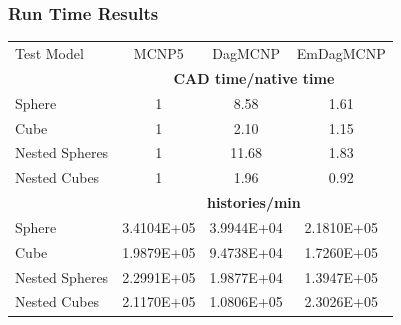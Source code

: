 \documentclass[12pt]{beamer}
\begin{document}
\begin{frame}
\frametitle{Run Time Results}

\begin{table}
  \small
  \begin{center}

      \label{timings}
    \begin{tabular}{lccc}


      \toprule
      Test Model & MCNP5 & DagMCNP & EmDagMCNP \\
      & \multicolumn{3}{c}{\textbf{CAD time/native time}} \\
      \hline
      Sphere & 1 & 8.58 & 1.61 \\
      Cube & 1 & 2.10 & 1.15 \\
      Nested Spheres & 1 & 11.68 & 1.83 \\
      Nested Cubes & 1 & 1.96 & 0.92 \\
      \hline
      &  \multicolumn{3}{c}{\textbf{histories/min}} \\
      \hline
      Sphere & 3.4104E+05  & 3.9944E+04  & 2.1810E+05   \\
      Cube & 1.9879E+05 & 9.4738E+04 & 1.7260E+05 \\
      Nested Spheres & 2.2991E+05 & 1.9877E+04 & 1.3947E+05 \\
      Nested Cubes & 2.1170E+05 & 1.0806E+05 & 2.3026E+05 \\
      \bottomrule

      
    \end{tabular}
  \end{center}
\end{table}


\end{frame}
\end{document}
